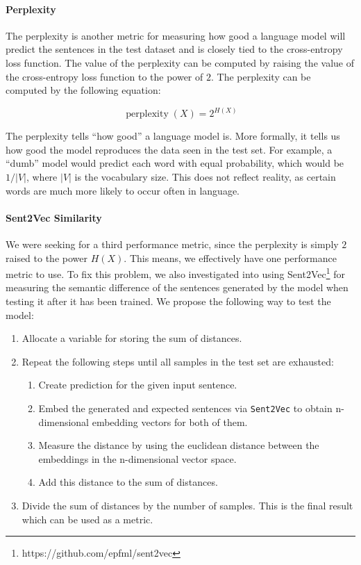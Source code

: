 \paragraph{Perplexity} The perplexity is another metric for measuring how good a language model will predict the sentences in the test dataset and is closely tied to the cross-entropy loss function. The value of the perplexity can be computed by raising the value of the cross-entropy loss function to the power of $2$. The perplexity can be computed by the following equation:

\begin{equation}
\operatorname{perplexity}(X) = 2^{H(X)}
\end{equation}

The perplexity tells ``how good'' a language model is. More formally, it tells us how good the model reproduces the data seen in the test set. For example, a ``dumb'' model would predict each word with equal probability, which would be $1/|V|$, where $|V|$ is the vocabulary size. This does not reflect reality, as certain words are much more likely to occur often in language.

\paragraph{Sent2Vec Similarity} We were seeking for a third performance metric, since the perplexity is simply $2$ raised to the power $H(X)$. This means, we effectively have one performance metric to use. To fix this problem, we also investigated into using Sent2Vec\footnote{https://github.com/epfml/sent2vec} \cite{Pgj:2017} for measuring the semantic difference of the sentences generated by the model when testing it after it has been trained. We propose the following way to test the model:

\begin{enumerate}[noitemsep]
	\item Allocate a variable for storing the sum of distances.
	\item Repeat the following steps until all samples in the test set are exhausted:
	\begin{enumerate}[noitemsep]
		\item Create prediction for the given input sentence.
		\item Embed the generated and expected sentences via \texttt{Sent2Vec} to obtain n-dimensional embedding vectors for both of them.
		\item Measure the distance by using the euclidean distance between the embeddings in the n-dimensional vector space.
		\item Add this distance to the sum of distances.
	\end{enumerate}
	\item Divide the sum of distances by the number of samples. This is the final result which can be used as a metric.
\end{enumerate}

